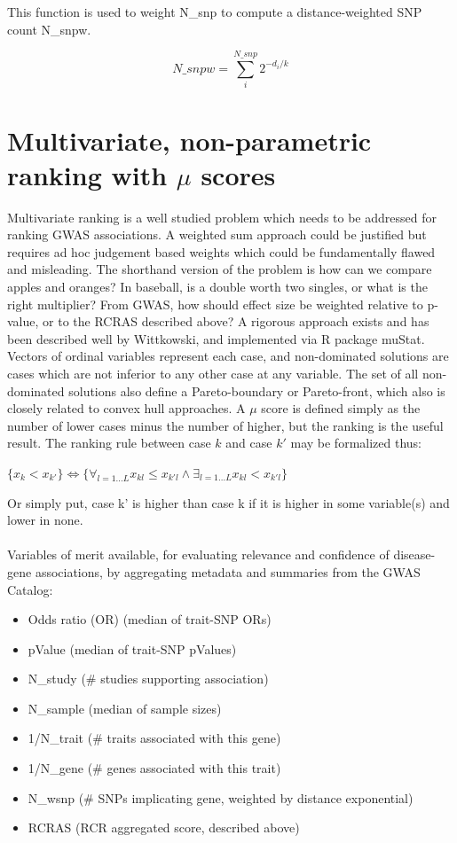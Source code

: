 \documentclass[12pt]{extarticle}
\begin{document}
This function is used to weight N\_snp to compute a distance-weighted SNP count N\_snpw.

\begin{equation}
    N\_snpw = \sum_{i}^{N\_snp}  2^{-d_{i}/k}
\end{equation}

\section{Multivariate, non-parametric ranking with $\mu$ scores}

Multivariate ranking is a well studied problem which needs to be addressed for ranking GWAS associations. A weighted sum approach could be justified but requires ad hoc judgement based weights which could be fundamentally flawed and misleading. The shorthand version of the problem is how can we compare apples and oranges? In baseball, is a double worth two singles, or what is the right multiplier? From GWAS, how should effect size be weighted relative to p-value, or to the RCRAS described above? A rigorous approach exists and has been described well by Wittkowski\cite{witt_sports}, and implemented via R package muStat\cite{muStat}. Vectors of ordinal variables represent each case, and non-dominated solutions are cases which are not inferior to any other case at any variable. The set of all non-dominated solutions also define a Pareto-boundary or Pareto-front, which also is closely related to convex hull approaches. A $\mu$ score is defined simply as the number of lower cases minus the number of higher, but the ranking is the useful result. The ranking rule between case $k$ and case $k'$ may be formalized thus:

\begin{center}
$\{ x_{k} < x_{k'} \} \Leftrightarrow \{ \forall_{l=1...L}x_{kl} \leq x_{k'l} \wedge \exists_{l=1...L}x_{kl} < x_{k'l}  \}$
\end{center}


Or simply put, case k' is higher than case k if it is higher in some variable(s) and lower in none. \\
\\
Variables of merit available, for evaluating relevance and confidence of disease-gene associations, by aggregating metadata and summaries from the GWAS Catalog:

\begin{itemize}
    \item Odds ratio (OR) (median of trait-SNP ORs)
    \item pValue (median of trait-SNP pValues)
    \item N\_study (\# studies supporting association)
    \item N\_sample (median of sample sizes)
    \item 1/N\_trait (\# traits associated with this gene)
    \item 1/N\_gene (\# genes associated with this trait)
    \item N\_wsnp (\# SNPs implicating gene, weighted by distance exponential) 
    \item RCRAS (RCR aggregated score, described above)
\end{itemize}
\end{document}

